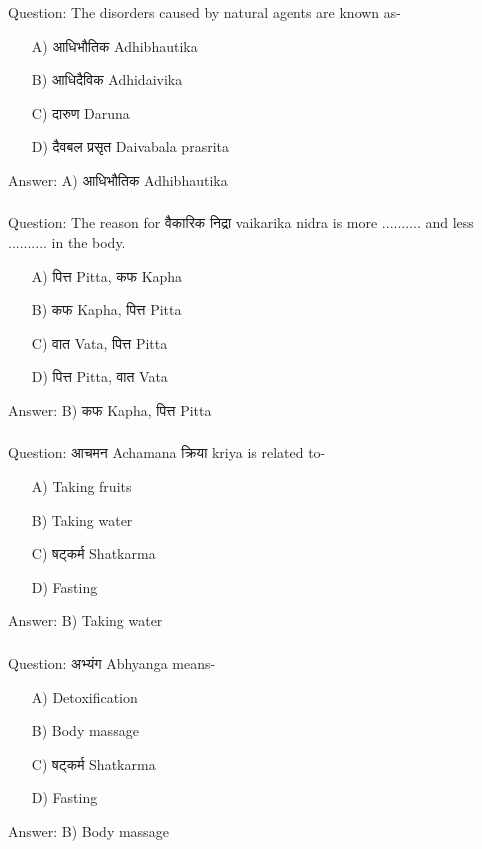 \begin{frame}[fragile]\frametitle{}

Question: The disorders caused by natural agents are known as-

\begin{itemize}
\item[A)] आधिभौतिक Adhibhautika
\item[B)] आधिदैविक Adhidaivika
\item[C)] दारुण Daruna
\item[D)] दैवबल प्रसृत Daivabala prasrita
\end{itemize}

Answer: A) आधिभौतिक Adhibhautika
\end{frame}

\begin{frame}[fragile]\frametitle{}

Question: The reason for वैकारिक निद्रा vaikarika nidra is more .......... and less .......... in the body.

\begin{itemize}
\item[A)] पित्त Pitta, कफ Kapha
\item[B)] कफ Kapha, पित्त Pitta
\item[C)] वात Vata, पित्त Pitta
\item[D)] पित्त Pitta, वात Vata
\end{itemize}

Answer: B) कफ Kapha, पित्त Pitta
\end{frame}

\begin{frame}[fragile]\frametitle{}

Question: आचमन Achamana क्रिया kriya is related to-

\begin{itemize}
\item[A)] Taking fruits
\item[B)] Taking water
\item[C)] षट्कर्म Shatkarma
\item[D)] Fasting
\end{itemize}

Answer: B) Taking water
\end{frame}

\begin{frame}[fragile]\frametitle{}

Question: अभ्यंग Abhyanga means-

\begin{itemize}
\item[A)] Detoxification
\item[B)] Body massage
\item[C)] षट्कर्म Shatkarma
\item[D)] Fasting
\end{itemize}

Answer: B) Body massage
\end{frame}

